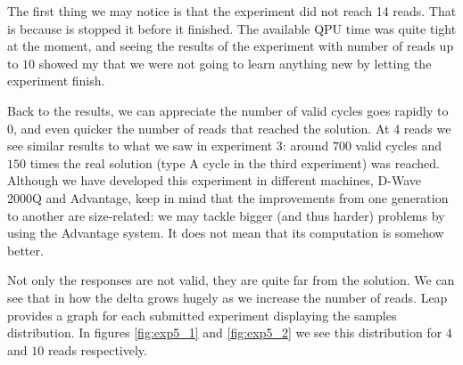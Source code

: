 \begin{table}[H]
	\centering
	\caption{Results of experiment 5, $10.000$ reads using the quantum annealer.}
	\label{tab:exp5_2}
\end{table}

The first thing we may notice is that the experiment did not reach 14 reads. That is because is stopped it before it finished. The available QPU time was quite tight at the moment, and seeing the results of the experiment with number of reads up to $10$ showed my that we were not going to learn anything new by letting the experiment finish.

Back to the results, we can appreciate the number of valid cycles goes rapidly to $0$, and even quicker the number of reads that reached the solution. At 4 reads we see similar results to what we saw in experiment 3: around $700$ valid cycles and $150$ times the real solution (type A cycle in the third experiment) was reached. Although we have developed this experiment in different machines, D-Wave 2000Q and Advantage, keep in mind that the improvements from one generation to another are size-related: we may tackle bigger (and thus harder) problems by using the Advantage system. It does not mean that its computation is somehow better.

Not only the responses are not valid, they are quite far from the solution. We can see that in how the delta grows hugely as we increase the number of reads. Leap provides a graph for each submitted experiment displaying the samples distribution. In figures \ref{fig:exp5_1} and \ref{fig:exp5_2} we see this distribution for $4$ and $10$ reads respectively. 

